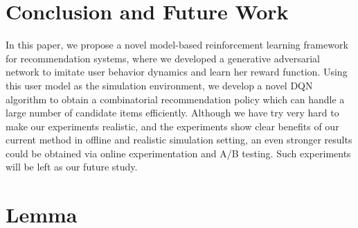\documentclass{article} %
\begin{document}
\vspace{-3mm}
\section{Conclusion and Future Work}
\vspace{-3mm}

 In this paper, we propose a novel model-based reinforcement learning framework for recommendation systems, where we developed a generative adversarial network to imitate user behavior dynamics and learn her reward function. Using this user model as the simulation environment, we develop a novel DQN algorithm to obtain a combinatorial recommendation policy which can handle a large number of candidate items efficiently. Although we have try very hard to make our experiments realistic, and the experiments show clear benefits of our current method in offline and realistic simulation setting, an even stronger results could be obtained via online experimentation and A/B testing. Such experiments will be left as our future study. 

\newpage



\newpage

\appendix
\section{Lemma}\label{app:proof}
\end{document}
